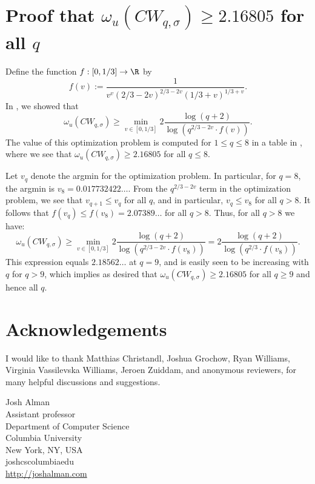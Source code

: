 \documentclass{toc}
\begin{document}
\appendix
\section{Proof that $\omega_u(CW_{q,\sigma}) \geq 2.16805$ for all $q$} \label{appone}

Define the function $f : [0,1/3] \to \R$ by
$$f(v) := \frac{1}{v^v (2/3 - 2v)^{2/3 - 2v} (1/3 + v)^{1/3+v}}.$$
In , we showed that $$\omega_u(CW_{q,\sigma}) \geq \min_{v \in [0,1/3]} 2\frac{\log(q+2) }{ \log(q^{2/3 - 2v} \cdot f(v))}.$$
The value of this optimization problem is computed for $1 \leq q \leq 8$ in a table in , where we see that $\omega_u(CW_{q,\sigma}) \geq 2.16805$ for all $q \leq 8$.

Let $v_q$ denote the argmin for the optimization problem. In particular, for $q=8$, the argmin is $v_8  = 0.017732422\ldots$. {}From the $q^{2/3 - 2v}$ term in the optimization problem, we see that $v_{q+1} \leq v_q$ for all $q$, and in particular, $v_q \leq v_8$ for all $q > 8$. It follows that $f(v_q) \leq f(v_8) = 2.07389\ldots$ for all $q>8$. Thus, for all $q>8$ we have:
$$\omega_u(CW_{q,\sigma}) \geq \min_{v \in [0,1/3]} 2\frac{\log(q+2) }{ \log(q^{2/3 - 2v} \cdot f(v_8))} = 2\frac{\log(q+2) }{ \log(q^{2/3} \cdot f(v_8))}.$$
This expression equals $2.18562\ldots$ at $q=9$, and is easily seen to be increasing with $q$ for $q>9$, which implies as desired that  $\omega_u(CW_{q,\sigma}) \geq 2.16805$ for all $q \geq 9$ and hence all $q$.

\section*{Acknowledgements} I would like to thank Matthias Christandl, Joshua Grochow, Ryan Williams, Virginia Vassilevska Williams, Jeroen Zuiddam, and anonymous reviewers, for many helpful discussions and suggestions.






%
%
%
%
%


%
%
%
%
%
\begin{tocauthors}
\begin{tocinfo}[alman]
 Josh Alman\\
 Assistant professor\\
 Department of Computer Science\\ %
 Columbia University\\
 New York, NY, USA\\
 josh\tocat{}cs\tocdot{}columbia\tocdot{}edu \\   %
 \url{http://joshalman.com}      %
\end{tocinfo}
\end{tocauthors}
\end{document}
